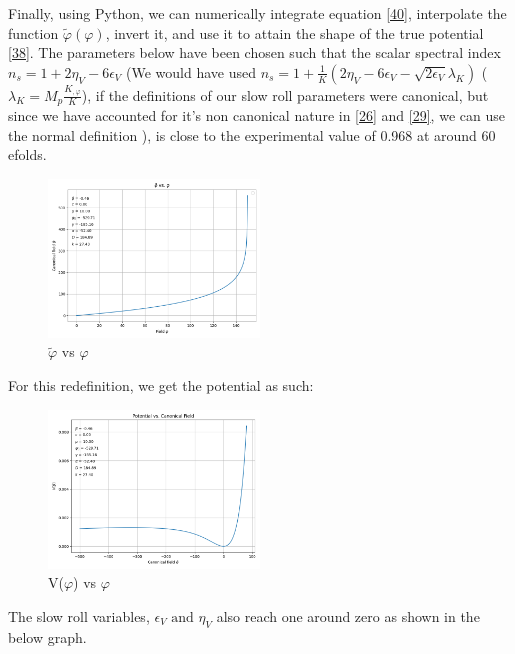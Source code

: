 \documentclass[aps,prd,reprint,preprintnumbers,showpacs,floatfix,nofootinbib,superscript address]{revtex4-2}
\begin{document}
Finally, using Python, we can numerically integrate equation \ref{40}, interpolate the function $\tilde{\varphi}(\varphi)$, invert it, and use it to attain the shape of the true potential \ref{38}. The parameters below have been chosen such that the scalar spectral index $n_s = 1 + 2\eta_V - 6 \epsilon_V$ (We would have used $n_s = 1 + \frac{1}{K}(2\eta_V - 6 \epsilon_V -\sqrt{2\epsilon_V}\lambda_K)$ ($\lambda_K = M_p \frac{K_{,\varphi}}{K}$), if the definitions of our slow roll parameters were canonical, but since we have accounted for it's non canonical nature in \ref{26} and \ref{29}, we can use the normal definition \cite{chung2003running} ),  is close to the experimental value of 0.968 at around 60 efolds.

\begin{figure}[h!]
    \centering
    \includegraphics[width=0.5\textwidth]{Python/Figures/Redefinition with correct parameters.png}
    \caption{$\tilde{\varphi}$ vs $\varphi$}
    \label{Canonical field vs field}
\end{figure}
For this redefinition, we get the potential as such:

\begin{figure}[h!]
    \centering
    \includegraphics[width=0.5\textwidth]{Python/Figures/Potential with correct parameters.png}
    \caption{V($\varphi$) vs $\varphi$}
    \label{Full Potential}
\end{figure}

The slow roll variables, $\epsilon_V \, \, \text{and} \, \, \eta_V$ also reach one around zero as shown in the below graph.
\end{document}
